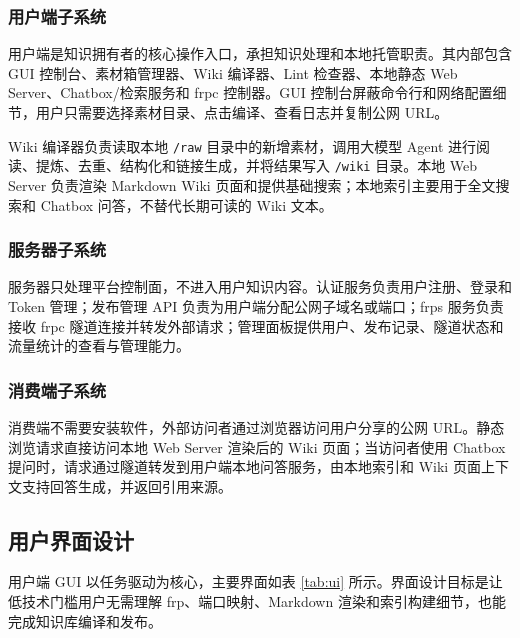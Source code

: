 \documentclass[UTF8,a4paper,12pt,fontset=fandol]{ctexart}
\newcommand{\code}[1]{\texttt{\footnotesize #1}}
\begin{document}
\subsubsection{用户端子系统}
用户端是知识拥有者的核心操作入口，承担知识处理和本地托管职责。其内部包含 GUI 控制台、素材箱管理器、Wiki 编译器、Lint 检查器、本地静态 Web Server、Chatbox/检索服务和 frpc 控制器。GUI 控制台屏蔽命令行和网络配置细节，用户只需要选择素材目录、点击编译、查看日志并复制公网 URL。

Wiki 编译器负责读取本地 \code{/raw} 目录中的新增素材，调用大模型 Agent 进行阅读、提炼、去重、结构化和链接生成，并将结果写入 \code{/wiki} 目录。本地 Web Server 负责渲染 Markdown Wiki 页面和提供基础搜索；本地索引主要用于全文搜索和 Chatbox 问答，不替代长期可读的 Wiki 文本。

\subsubsection{服务器子系统}
服务器只处理平台控制面，不进入用户知识内容。认证服务负责用户注册、登录和 Token 管理；发布管理 API 负责为用户端分配公网子域名或端口；frps 服务负责接收 frpc 隧道连接并转发外部请求；管理面板提供用户、发布记录、隧道状态和流量统计的查看与管理能力。

\subsubsection{消费端子系统}
消费端不需要安装软件，外部访问者通过浏览器访问用户分享的公网 URL。静态浏览请求直接访问本地 Web Server 渲染后的 Wiki 页面；当访问者使用 Chatbox 提问时，请求通过隧道转发到用户端本地问答服务，由本地索引和 Wiki 页面上下文支持回答生成，并返回引用来源。

\subsection{用户界面设计}
用户端 GUI 以任务驱动为核心，主要界面如表 \ref{tab:ui} 所示。界面设计目标是让低技术门槛用户无需理解 frp、端口映射、Markdown 渲染和索引构建细节，也能完成知识库编译和发布。
\end{document}
